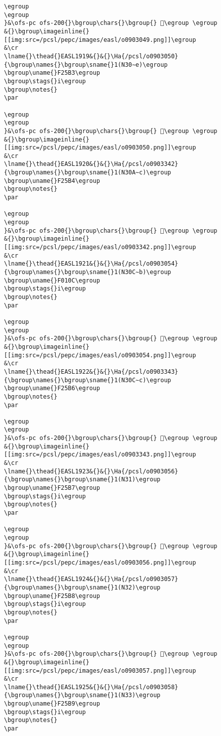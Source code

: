 \begin{verbatim}
\egroup
\egroup
}&\ofs-pc ofs-200{}\bgroup\chars{}\bgroup{} 󲖲\egroup \egroup
&{}\bgroup\imageinline{}[[img:src=/pcsl/pepc/images/easl/o0903049.png]]\egroup
&\cr
\lname{}\thead{}EASL1919&{}&{}\Ha{/pcsl/o0903050}{\bgroup\names{}\bgroup\sname{}1(N30∼e)\egroup
\bgroup\uname{}F25B3\egroup
\bgroup\stags{}i\egroup
\bgroup\notes{}
\par 

\egroup
\egroup
}&\ofs-pc ofs-200{}\bgroup\chars{}\bgroup{} 󲖳\egroup \egroup
&{}\bgroup\imageinline{}[[img:src=/pcsl/pepc/images/easl/o0903050.png]]\egroup
&\cr
\lname{}\thead{}EASL1920&{}&{}\Ha{/pcsl/o0903342}{\bgroup\names{}\bgroup\sname{}1(N30A∼c)\egroup
\bgroup\uname{}F25B4\egroup
\bgroup\notes{}
\par 

\egroup
\egroup
}&\ofs-pc ofs-200{}\bgroup\chars{}\bgroup{} 󲖴\egroup \egroup
&{}\bgroup\imageinline{}[[img:src=/pcsl/pepc/images/easl/o0903342.png]]\egroup
&\cr
\lname{}\thead{}EASL1921&{}&{}\Ha{/pcsl/o0903054}{\bgroup\names{}\bgroup\sname{}1(N30C∼b)\egroup
\bgroup\uname{}F010C\egroup
\bgroup\stags{}i\egroup
\bgroup\notes{}
\par 

\egroup
\egroup
}&\ofs-pc ofs-200{}\bgroup\chars{}\bgroup{} 󰄌\egroup \egroup
&{}\bgroup\imageinline{}[[img:src=/pcsl/pepc/images/easl/o0903054.png]]\egroup
&\cr
\lname{}\thead{}EASL1922&{}&{}\Ha{/pcsl/o0903343}{\bgroup\names{}\bgroup\sname{}1(N30C∼c)\egroup
\bgroup\uname{}F25B6\egroup
\bgroup\notes{}
\par 

\egroup
\egroup
}&\ofs-pc ofs-200{}\bgroup\chars{}\bgroup{} 󲖶\egroup \egroup
&{}\bgroup\imageinline{}[[img:src=/pcsl/pepc/images/easl/o0903343.png]]\egroup
&\cr
\lname{}\thead{}EASL1923&{}&{}\Ha{/pcsl/o0903056}{\bgroup\names{}\bgroup\sname{}1(N31)\egroup
\bgroup\uname{}F25B7\egroup
\bgroup\stags{}i\egroup
\bgroup\notes{}
\par 

\egroup
\egroup
}&\ofs-pc ofs-200{}\bgroup\chars{}\bgroup{} 󲖷\egroup \egroup
&{}\bgroup\imageinline{}[[img:src=/pcsl/pepc/images/easl/o0903056.png]]\egroup
&\cr
\lname{}\thead{}EASL1924&{}&{}\Ha{/pcsl/o0903057}{\bgroup\names{}\bgroup\sname{}1(N32)\egroup
\bgroup\uname{}F25B8\egroup
\bgroup\stags{}i\egroup
\bgroup\notes{}
\par 

\egroup
\egroup
}&\ofs-pc ofs-200{}\bgroup\chars{}\bgroup{} 󲖸\egroup \egroup
&{}\bgroup\imageinline{}[[img:src=/pcsl/pepc/images/easl/o0903057.png]]\egroup
&\cr
\lname{}\thead{}EASL1925&{}&{}\Ha{/pcsl/o0903058}{\bgroup\names{}\bgroup\sname{}1(N33)\egroup
\bgroup\uname{}F25B9\egroup
\bgroup\stags{}i\egroup
\bgroup\notes{}
\par 


\end{verbatim}

